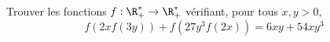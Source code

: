 Trouver les fonctions $f : \R_+^*\to \R_+^*$ vérifiant, pour tous $x, y > 0$,
$$f(2xf(3y)) + f(27y^3f(2x)) = 6xy + 54xy^3$$